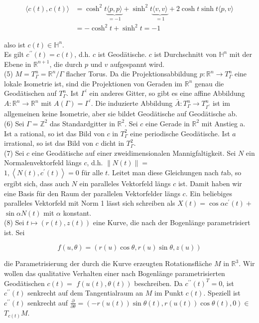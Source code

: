 \documentclass[10pt, letterpaper]{article}
\begin{document}
$$
\begin{aligned}
\langle c(t), c(t)\rangle & =\cosh ^{2} t \underbrace{\langle p, p\rangle}_{=-1}+\sinh ^{2} t \underbrace{\langle v, v\rangle}_{=1}+2 \cosh t \sinh t\langle p, v\rangle \\
& =-\cosh ^{2} t+\sinh ^{2} t=-1
\end{aligned}
$$

also ist $c(t) \in \mathbb{H}^{n}$.\\
Es gilt $c^{\prime \prime}(t)=c(t)$, d.h. $c$ ist Geodätische. $c$ ist Durchschnitt von $\mathbb{H}^{n}$ mit der Ebene in $\mathbb{R}^{n+1}$, die durch $p$ und $v$ aufgespannt wird.\\
(5) $M=T_{\Gamma}^{n}=\mathbb{R}^{n} / \Gamma$ flacher Torus. Da die Projektionsabbildung $p: \mathbb{R}^{n} \rightarrow T_{\Gamma}^{n}$ eine lokale Isometrie ist, sind die Projektionen von Geraden im $\mathbb{R}^{n}$ genau die Geodätischen auf $T_{\Gamma}^{n}$. Ist $\Gamma^{\prime}$ ein anderes Gitter, so gibt es eine affine Abbildung $A: \mathbb{R}^{n} \rightarrow \mathbb{R}^{n}$ mit $A(\Gamma)=\Gamma^{\prime}$. Die induzierte Abbildung $\bar{A}: T_{\Gamma}^{n} \rightarrow T_{\Gamma^{\prime}}^{n}$ ist im allgemeinen keine Isometrie, aber sie bildet Geodätische auf Geodätische ab.\\
(6) Sei $\Gamma=\mathbb{Z}^{2}$ das Standardgitter in $\mathbb{R}^{2}$. Sei $c$ eine Gerade in $\mathbb{R}^{2}$ mit Anstieg a. Ist a rational, so ist das Bild von $c$ in $T_{\Gamma}^{2}$ eine periodische Geodätische. Ist $a$ irrational, so ist das Bild von $c$ dicht in $T_{\Gamma}^{2}$.\\
(7) Sei $c$ eine Geodätische auf einer zweidimensionalen Mannigfaltigkeit. Sei $N$ ein Normalenvektorfeld längs $c$, d.h. $\|N(t)\|=$\\
$1,\left\langle N(t), c^{\prime}(t)\right\rangle=0$ für alle $t$. Leitet man diese Gleichungen nach $t \mathrm{ab}$, so ergibt sich, dass auch $N$ ein paralleles Vektorfeld längs $c$ ist. Damit haben wir eine Basis für den Raum der parallelen Vektorfelder längs $c$. Ein beliebiges paralleles Vektorfeld mit Norm 1 lässt sich schreiben als $X(t)=\cos \alpha c^{\prime}(t)+$ $\sin \alpha N(t)$ mit $\alpha$ konstant.\\
(8) Sei $t \mapsto(r(t), z(t))$ eine Kurve, die nach der Bogenlänge parametrisiert ist. Sei

$$
f(u, \theta)=(r(u) \cos \theta, r(u) \sin \theta, z(u))
$$

die Parametrisierung der durch die Kurve erzeugten Rotationsfläche $M$ in $\mathbb{R}^{3}$. Wir wollen das qualitative Verhalten einer nach Bogenlänge parametrisierten Geodätischen $c(t)=$ $f(u(t), \theta(t))$ beschreiben. Da $c^{\prime \prime}(t)^{T}=0$, ist $c^{\prime \prime}(t)$ senkrecht auf dem Tangentialraum an $M$ im Punkt $c(t)$. Speziell ist $c^{\prime \prime}(t)$ senkrecht auf $\frac{\partial}{\partial \theta}=(-r(u(t)) \sin \theta(t), r(u(t)) \cos \theta(t), 0) \in$ $T_{c(t)} M$.
\end{document}
